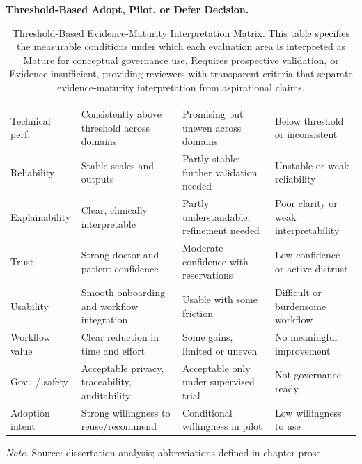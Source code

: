 \noindent\textbf{Threshold-Based Adopt, Pilot, or Defer Decision.}

{\tablestripes\tablefontsize
\begin{xltabular}{\textwidth}{@{} >{\raggedright\arraybackslash}p{1.6cm} L L L @{}}
\caption[Threshold-Based Evidence-Maturity Interpretation Matrix]{Threshold-Based Evidence-Maturity Interpretation Matrix. This table specifies the measurable conditions under which each evaluation area is interpreted as Mature for conceptual governance use, Requires prospective validation, or Evidence insufficient, providing reviewers with transparent criteria that separate evidence-maturity interpretation from aspirational claims.}\label{tab:adopt_pilot_defer_matrix} \\
\toprule
{} &  &  &  \\
\midrule
\endfirsthead
\toprule
{} &  &  &  \\
\midrule
\endhead
\bottomrule
\endlastfoot
Technical perf. & Consistently above threshold across domains & Promising but uneven across domains & Below threshold or inconsistent \\
\addlinespace
Reliability & Stable scales and outputs & Partly stable; further validation needed & Unstable or weak reliability \\
\addlinespace
Explainability & Clear, clinically interpretable & Partly understandable; refinement needed & Poor clarity or weak interpretability \\
\addlinespace
Trust & Strong doctor and patient confidence & Moderate confidence with reservations & Low confidence or active distrust \\
\addlinespace
Usability & Smooth onboarding and workflow integration & Usable with some friction & Difficult or burdensome workflow \\
\addlinespace
Workflow value & Clear reduction in time and effort & Some gains, limited or uneven & No meaningful improvement \\
\addlinespace
Gov.\ / safety & Acceptable privacy, traceability, auditability & Acceptable only under supervised trial & Not governance-ready \\
\addlinespace
Adoption intent & Strong willingness to reuse/recommend & Conditional willingness in pilot & Low willingness to use \\
\end{xltabular}}
\vspace{0.3em}\noindent\textit{Note.} Source: dissertation analysis; abbreviations defined in chapter prose.

